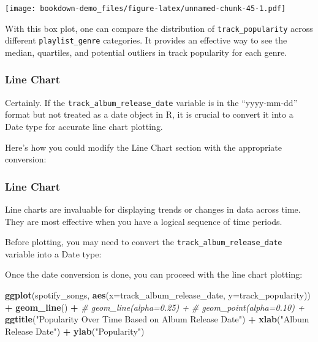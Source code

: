 \documentclass[
  b5paper]{book}
\newenvironment{Shaded}{\begin{snugshade}}{\end{snugshade}}
\newcommand{\AttributeTok}[1]{\textcolor[rgb]{0.13,0.29,0.53}{#1}}
\newcommand{\CommentTok}[1]{\textcolor[rgb]{0.56,0.35,0.01}{\textit{#1}}}
\newcommand{\FunctionTok}[1]{\textcolor[rgb]{0.13,0.29,0.53}{\textbf{#1}}}
\newcommand{\NormalTok}[1]{#1}
\newcommand{\OtherTok}[1]{\textcolor[rgb]{0.56,0.35,0.01}{#1}}
\newcommand{\SpecialCharTok}[1]{\textcolor[rgb]{0.81,0.36,0.00}{\textbf{#1}}}
\newcommand{\StringTok}[1]{\textcolor[rgb]{0.31,0.60,0.02}{#1}}
\begin{document}
\texttt{[image: bookdown-demo\_files/figure-latex/unnamed-chunk-45-1.pdf]}

With this box plot, one can compare the distribution of \texttt{track\_popularity} across different \texttt{playlist\_genre} categories. It provides an effective way to see the median, quartiles, and potential outliers in track popularity for each genre.

\hypertarget{line-chart}{%
\subsubsection{Line Chart}\label{line-chart}}

Certainly. If the \texttt{track\_album\_release\_date} variable is in the ``yyyy-mm-dd'' format but not treated as a date object in R, it is crucial to convert it into a Date type for accurate line chart plotting.

Here's how you could modify the Line Chart section with the appropriate conversion:

\hypertarget{line-chart-1}{%
\subsubsection{Line Chart}\label{line-chart-1}}

Line charts are invaluable for displaying trends or changes in data across time. They are most effective when you have a logical sequence of time periods.

Before plotting, you may need to convert the \texttt{track\_album\_release\_date} variable into a Date type:

\begin{Shaded}
\end{Shaded}

Once the date conversion is done, you can proceed with the line chart plotting:

\begin{Shaded}
\begin{Highlighting}[]
  \FunctionTok{ggplot}\NormalTok{(spotify\_songs, }\FunctionTok{aes}\NormalTok{(}\AttributeTok{x=}\NormalTok{track\_album\_release\_date, }\AttributeTok{y=}\NormalTok{track\_popularity)) }\SpecialCharTok{+}
    \FunctionTok{geom\_line}\NormalTok{() }\SpecialCharTok{+}
\CommentTok{\#    geom\_line(alpha=0.25) +}
\CommentTok{\#    geom\_point(alpha=0.10) +}
    \FunctionTok{ggtitle}\NormalTok{(}\StringTok{"Popularity Over Time Based on Album Release Date"}\NormalTok{) }\SpecialCharTok{+}
    \FunctionTok{xlab}\NormalTok{(}\StringTok{"Album Release Date"}\NormalTok{) }\SpecialCharTok{+}
    \FunctionTok{ylab}\NormalTok{(}\StringTok{"Popularity"}\NormalTok{)}
\end{Highlighting}
\end{Shaded}
\end{document}

